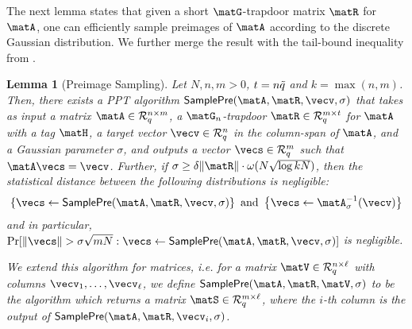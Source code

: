 \documentclass[11pt,letterpaper]{article}
\newcounter{theo}[section]
\newtheorem{lemma}[theorem]{Lemma}
\theoremstyle{definition} %
\newcommand{\from}{\gets}
\begin{document}
\noindent The next lemma \cite{DBLP:conf/eurocrypt/MicciancioP12} states that given a short $\matG$-trapdoor matrix $\matR$ for $\matA$, one can efficiently sample preimages of $\matA$ according to the discrete Gaussian distribution. We further merge the result with the tail-bound inequality from \cite{MicciancioR07}.

\begin{lemma}[Preimage Sampling]\label{lem:samplepre}
Let $N,n,m>0$, $t = n{\tilde{q}}$ and $k = \max(n,m)$. Then, there exists a PPT algorithm $\samplepre(\matA,\matR,\vecv,\sigma)$ that takes as input a matrix $\matA \in \Rq^{n \times m}$, a $\matG_n$-trapdoor $\matR \in \Rq^{m \times t}$ for $\matA$ with a tag $\matH$, a target vector $\vecv \in \Rq^n$ in the column-span of $\matA$, and a Gaussian parameter $\sigma$, and outputs a vector $\vecs \in \Rq^m$ such that $\matA\vecs=\vecv$. Further, if $\sigma \geq \delta \|\matR\| \cdot \omega(N\sqrt{\log kN})$, then the statistical distance between the following distributions is negligible:
  \begin{equation*}
	    \left\{ \vecs \from \samplepre(\matA,\matR,\vecv,\sigma) \right\} \text{ and }
	    \left\{ \vecs \from \matA^{-1}_\sigma(\vecv)
	    \right\}
	  \end{equation*}
and in particular, $\Pr[\|\vecs\| > \sigma \sqrt{mN} :  \vecs \from \samplepre(\matA,\matR,\vecv,\sigma)]$ is negligible.

We extend this algorithm for matrices, i.e. for a matrix $\matV \in \Rq^{n \times \ell}$ with columns $\vecv_1,\ldots,\vecv_\ell$, we define $\samplepre(\matA,\matR,\matV,\sigma)$ to be the algorithm which returns a matrix $\matS \in \Rq^{m \times \ell}$, where the $i$-th column is the output of $\samplepre(\matA,\matR,\vecv_i,\sigma)$.
\end{lemma}
\end{document}
